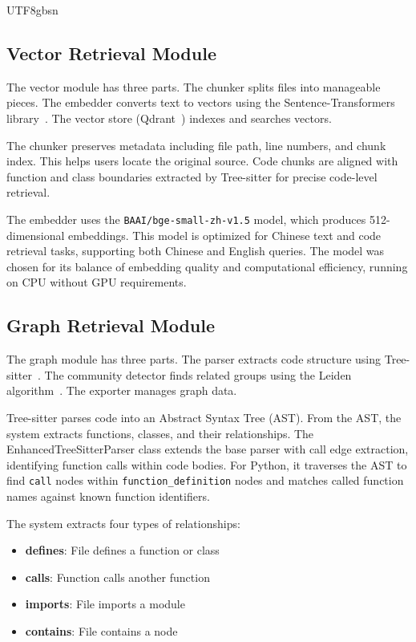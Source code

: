 \documentclass[11pt]{article}
\begin{document}
\begin{CJK*}{UTF8}{gbsn}
\subsection{Vector Retrieval Module}
The vector module has three parts. The chunker splits files into manageable pieces. The embedder converts text to vectors using the Sentence-Transformers library~\cite{sentencetransformers2023}. The vector store (Qdrant~\cite{qdrant2024}) indexes and searches vectors.

The chunker preserves metadata including file path, line numbers, and chunk index. This helps users locate the original source. Code chunks are aligned with function and class boundaries extracted by Tree-sitter for precise code-level retrieval.

The embedder uses the \texttt{BAAI/bge-small-zh-v1.5} model, which produces 512-dimensional embeddings. This model is optimized for Chinese text and code retrieval tasks, supporting both Chinese and English queries. The model was chosen for its balance of embedding quality and computational efficiency, running on CPU without GPU requirements.

\subsection{Graph Retrieval Module}
The graph module has three parts. The parser extracts code structure using Tree-sitter~\cite{trecs2024}. The community detector finds related groups using the Leiden algorithm~\cite{leiden2020}. The exporter manages graph data.

Tree-sitter parses code into an Abstract Syntax Tree (AST). From the AST, the system extracts functions, classes, and their relationships. The EnhancedTreeSitterParser class extends the base parser with call edge extraction, identifying function calls within code bodies. For Python, it traverses the AST to find \texttt{call} nodes within \texttt{function\_definition} nodes and matches called function names against known function identifiers.

The system extracts four types of relationships:
\begin{itemize}
    \item \textbf{defines}: File defines a function or class
    \item \textbf{calls}: Function calls another function
    \item \textbf{imports}: File imports a module
    \item \textbf{contains}: File contains a node
\end{itemize}


\end{CJK*}
\end{document}
